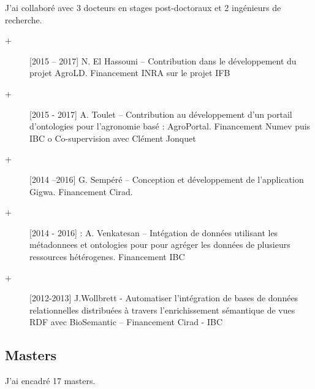 J’ai collaboré avec 3 docteurs en stages post-doctoraux et 2 ingénieurs de recherche.
\begin{description}
\item [+] [2015 – 2017] N. El Hassouni – Contribution dans le développement du projet AgroLD. Financement INRA sur le projet IFB 
\item [+] [2015 - 2017] A. Toulet – Contribution au développement d’un portail d’ontologies pour l’agronomie basé : AgroPortal. Financement Numev puis IBC
o	Co-supervision avec Clément Jonquet
\item [+] [2014 –2016] G. Sempéré – Conception et développement de l’application Gigwa. Financement Cirad.
\item [+] [2014 - 2016] : A. Venkatesan – Intégation de données utilisant les métadonnees et ontologies pour pour agréger les données de plusieurs ressources hétérogenes. Financement IBC
\item [+] [2012-2013] J.Wollbrett - Automatiser l’intégration de bases de données relationnelles distribuées à travers l’enrichissement sémantique de vues RDF avec BioSemantic – Financement Cirad - IBC
\end{description}

\subsection*{Masters }

J’ai encadré 17 masters.

